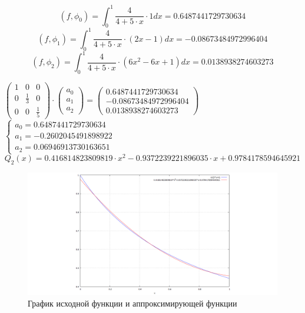\begin{displaymath}
(f, \phi_0) = \int_0^1 \frac{4}{4 + 5 \cdot x} \cdot 1 dx = 0.6487441729730634
\end{displaymath}
\begin{displaymath}
(f, \phi_1) = \int_0^1 \frac{4}{4 + 5 \cdot x} \cdot (2x - 1) dx = -0.08673484972996404
\end{displaymath}
\begin{displaymath}
(f, \phi_2) = \int_0^1 \frac{4}{4 + 5 \cdot x} \cdot (6x^2 - 6x + 1) dx = 0.0138938274603273
\end{displaymath}

$
\begin{pmatrix}
1 & 0 & 0
\\
0 & \frac{1}{3} & 0
\\
0 & 0 & \frac{1}{5}
\end{pmatrix}
\cdot
\begin{pmatrix}
a_0
\\
a_1
\\
a_2
\end{pmatrix}
=
\begin{pmatrix}
0.6487441729730634
\\
-0.08673484972996404
\\
0.0138938274603273
\end{pmatrix}
$\\[1mm]

$
 \begin{cases}
  a_0 = 0.6487441729730634
\\
  a_1 = -0.2602045491898922
\\
  a_2 = 0.06946913730163651
 \end{cases}
$\\[1mm]

\begin{displaymath}
Q_2(x) = 0.416814823809819 \cdot x^2 - 0.9372239221896035 \cdot x + 0.9784178594645921
\end{displaymath}

\begin{figure}[H]
	\begin{center}
		\includegraphics[width=19cm]{legandre.png}
		\caption{График исходной функции и аппроксимирующей функции} 
		\label{pic:2:3:1}
	\end{center}
\end{figure}

